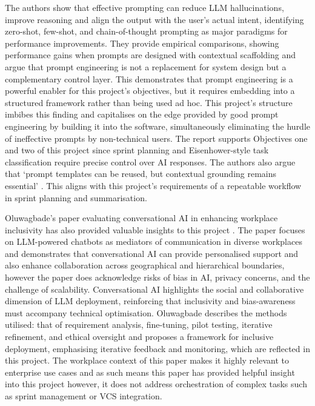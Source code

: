 \documentclass{report}
\begin{document}
The authors show that effective prompting can reduce LLM hallucinations, improve reasoning and align the output with the user's actual intent, identifying zero-shot, few-shot, and chain-of-thought prompting as major paradigms for performance improvements. 
They provide empirical comparisons, showing performance gains when prompts are designed with contextual scaffolding and argue that prompt engineering is not a replacement for system design but a complementary control layer. 
This demonstrates that prompt engineering is a powerful enabler for this project's objectives, but it requires embedding into a structured framework rather than being used ad hoc. 
This project's structure imbibes this finding and capitalises on the edge provided by good prompt engineering by building it into the software, simultaneously eliminating the hurdle of ineffective prompts by non-technical users. 
The report supports Objectives one and two of this project since sprint planning and Eisenhower-style task classification require precise control over AI responses. 
The authors also argue that `prompt templates can be reused, but contextual grounding remains essential' \parencite{whitePromptPatternCatalog2023}. 
This aligns with this project's requirements of a repeatable workflow in sprint planning and summarisation.

Oluwagbade's paper evaluating conversational AI in enhancing workplace inclusivity has also provided valuable insights to this project \parencite{oluwagbadeConversationalAINew2024}. 
The paper focuses on LLM-powered chatbots as mediators of communication in diverse workplaces and demonstrates that conversational AI can provide personalised support and also enhance collaboration across geographical and hierarchical boundaries, however the paper does acknowledge risks of bias in AI, privacy concerns, and the challenge of scalability. 
Conversational AI highlights the social and collaborative dimension of LLM deployment, reinforcing that inclusivity and bias-awareness must accompany technical optimisation. 
Oluwagbade describes the methods utilised: that of requirement analysis, fine-tuning, pilot testing, iterative refinement, and ethical oversight and proposes a framework for inclusive deployment, emphasising iterative feedback and monitoring, which are reflected in this project. 
The workplace context of this paper makes it highly relevant to enterprise use cases and as such means this paper has provided helpful insight into this project however, it does not address orchestration of complex tasks such as sprint management or VCS integration.  
\end{document}
